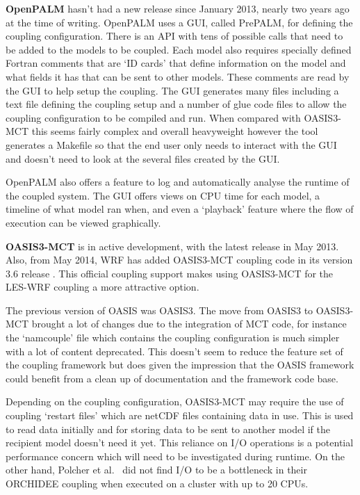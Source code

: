 \documentclass{acm_proc_article-sp}
\begin{document}
\textbf{OpenPALM} hasn't had a new release since January 2013, nearly two years
ago at the time of writing. OpenPALM uses a GUI, called PrePALM, for defining
the coupling configuration. There is an API with tens of possible calls that
need to be added to the models to be coupled. Each model also requires specially
defined Fortran comments that are `ID cards' that define information on the
model and what fields it has that can be sent to other models. These comments
are read by the GUI to help setup the coupling. The GUI generates many files
including a text file defining the coupling setup and a number of glue code
files to allow the coupling configuration to be compiled and run. When compared
with OASIS3-MCT this seems fairly complex and overall heavyweight however the
tool generates a Makefile so that the end user only needs to interact with the
GUI and doesn't need to look at the several files created by the GUI.

OpenPALM also offers a feature to log and automatically analyse the runtime of
the coupled system. The GUI offers views on CPU time for each model, a timeline
of what model ran when, and even a `playback' feature where the flow of
execution can be viewed graphically.

\textbf{OASIS3-MCT} is in active development, with the latest release in May
2013. Also, from May 2014, WRF has added OASIS3-MCT coupling code in its version
3.6 release \cite{ENES2014}. This official coupling support makes using
OASIS3-MCT for the LES-WRF coupling a more attractive option.

The previous version of OASIS was OASIS3. The move from OASIS3 to OASIS3-MCT
brought a lot of changes due to the integration of MCT code, for instance the
`namcouple' file which contains the coupling configuration is much simpler with
a lot of content deprecated. This doesn't seem to reduce the feature set of the
coupling framework but does given the impression that the OASIS framework could
benefit from a clean up of documentation and the framework code base.

Depending on the coupling configuration, OASIS3-MCT may require the use of
coupling `restart files' which are netCDF \cite{Unidata} files containing data
in use. This is used to read data initially and for storing data to be sent to
another model if the recipient model doesn't need it yet. This reliance on I/O
operations is a potential performance concern which will need to be investigated
during runtime. On the other hand, Polcher et al.\ \cite{Polcher2013} did not
find I/O to be a bottleneck in their ORCHIDEE coupling when executed on a
cluster with up to 20 CPUs.
\end{document}
